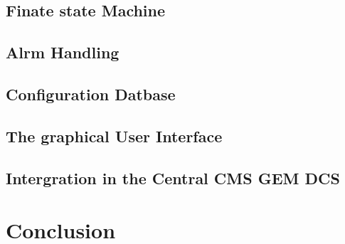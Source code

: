 
\smallskip
\subsection{Finate state Machine}


\smallskip
\subsection{Alrm Handling}


\smallskip
\subsection{Configuration Datbase}


\smallskip
\subsection{The graphical User Interface}


\smallskip
\subsection{Intergration in the Central CMS GEM DCS}


\smallskip
\section{Conclusion}




